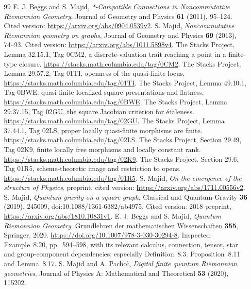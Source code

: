 \documentclass[11pt,a4paper]{article}
\theoremstyle{remark}\newtheorem{remark}[theorem]{Remark}
\begin{document}
\begin{thebibliography}{99}\small
{} E. J. Beggs and S. Majid,
\emph{*-Compatible Connections in Noncommutative Riemannian Geometry},
Journal of Geometry and Physics \textbf{61} (2011), 95--124.
Cited version: \url{https://arxiv.org/abs/0904.0539v2}.
 S. Majid,
\emph{Noncommutative Riemannian geometry on graphs},
Journal of Geometry and Physics \textbf{69} (2013), 74--93.
Cited version: \url{https://arxiv.org/abs/1011.5898v4}.
 The Stacks Project, Lemma 32.15.1, Tag 0CM2,
a discrete-valuation trait reaching a point in a finite-type closure.
\url{https://stacks.math.columbia.edu/tag/0CM2}.
 The Stacks Project, Lemma 29.57.2, Tag 01TI,
openness of the quasi-finite locus.
\url{https://stacks.math.columbia.edu/tag/01TI}.
 The Stacks Project, Lemma 49.10.1, Tag 0BWE,
quasi-finite localized square presentations and flatness.
\url{https://stacks.math.columbia.edu/tag/0BWE}.
 The Stacks Project, Lemma 29.37.15, Tag 02GU,
the square Jacobian criterion for \'etaleness.
\url{https://stacks.math.columbia.edu/tag/02GU}.
 The Stacks Project, Lemma 37.44.1, Tag 02LS,
proper locally quasi-finite morphisms are finite.
\url{https://stacks.math.columbia.edu/tag/02LS}.
 The Stacks Project, Section 29.49, Tag 02K9,
finite locally free morphisms and locally constant rank.
\url{https://stacks.math.columbia.edu/tag/02K9}.
 The Stacks Project, Section 29.6, Tag 01R5,
scheme-theoretic image and restriction to opens.
\url{https://stacks.math.columbia.edu/tag/01R5}.
 S. Majid,
\emph{On the emergence of the structure of Physics},
preprint, cited version: \url{https://arxiv.org/abs/1711.00556v2}.
 S. Majid,
\emph{Quantum gravity on a square graph},
Classical and Quantum Gravity \textbf{36} (2019), 245009,
doi:10.1088/1361-6382/ab4975.
Cited version: 2018 preprint, \url{https://arxiv.org/abs/1810.10831v1}.
 E. J. Beggs and S. Majid,
\emph{Quantum Riemannian Geometry}, Grundlehren der mathematischen
Wissenschaften \textbf{355}, Springer, 2020.
\url{https://doi.org/10.1007/978-3-030-30294-8}.
Inspected: Example~8.20, pp.~594--598, with its relevant calculus,
connection, tensor, star and group-component dependencies; especially
Definition~8.3, Proposition~8.11 and Lemma~8.17.
 S. Majid and A. Pacho\l{},
\emph{Digital finite quantum Riemannian geometries},
Journal of Physics A: Mathematical and Theoretical \textbf{53} (2020), 115202.

\end{thebibliography}
\end{document}
